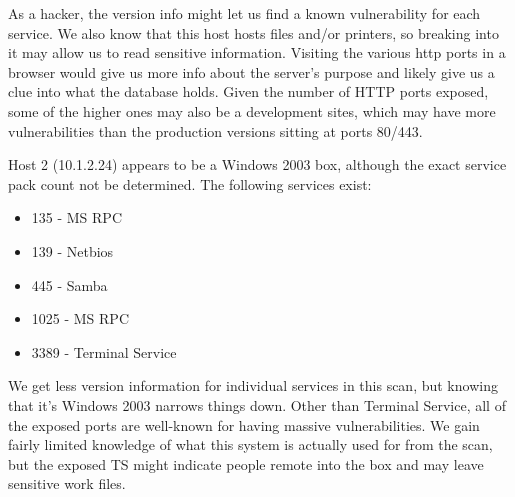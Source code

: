 \documentclass{article}
\begin{document}
\par As a hacker, the version info might let us find a known vulnerability for each service. We also know that this host hosts files and/or printers, so breaking
into it may allow us to read sensitive information. Visiting the various http
ports in a browser would give us more info about the server's purpose and likely
give us a clue into what the database holds. Given the number of HTTP ports exposed, some of the higher ones may also be a development sites, which
may have more vulnerabilities than the production versions sitting at ports 80/443.
\\
\par Host 2 (10.1.2.24) appears to be a Windows 2003 box, although the exact service pack count not be determined. The following services exist:
\begin{itemize}
	\item 135 - MS RPC
	\item 139 - Netbios
	\item 445 - Samba
	\item 1025 - MS RPC
	\item 3389 - Terminal Service
\end{itemize}

\par We get less version information for individual services in this scan, but knowing that it's Windows 2003 narrows things down. Other than Terminal Service,
all of the exposed ports are well-known for having massive vulnerabilities. We
gain fairly limited knowledge of what this system is actually used for from the scan, but the exposed TS might indicate people remote into the box and may
leave sensitive work files.
\end{document}
